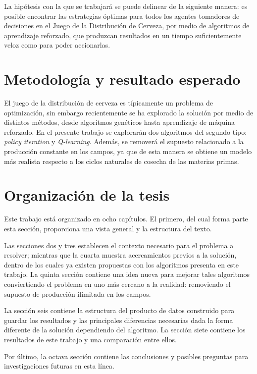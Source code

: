 La hip\'otesis con la que se trabajar\'a se puede delinear de la siguiente manera: es posible encontrar las estrategias \'optimas para todos los agentes tomadores de decisiones en el Juego de la Distribuci\'on de Cerveza, por medio de algoritmos de aprendizaje reforzado, que produzcan resultados en un tiempo suficientemente veloz como para poder accionarlas.\\

\section{Metodolog\'ia y resultado esperado}

El juego de la distribuci\'on de cerveza es t\'ipicamente un problema de optimizaci\'on, sin embargo recientemente se ha explorado la soluci\'on por medio de distintos m\'etodos, desde algoritmos gen\'eticos hasta aprendizaje de m\'aquina reforzado. En el presente trabajo se explorar\'an dos algoritmos del segundo tipo: \textit{policy iteration} y \textit{Q-learning}. Adem\'as, se remover\'a el supuesto relacionado a la producci\'on constante en los campos, ya que de esta manera se obtiene un modelo m\'as realista respecto a los ciclos naturales de cosecha de las materias primas.

\section{Organizaci\'on de la tesis}

Este trabajo est\'a organizado en ocho cap\'itulos. El primero, del cual forma parte esta secci\'on, proporciona una vista general y la estructura del texto.

Las secciones dos y tres establecen el contexto necesario para el problema a resolver; mientras que la cuarta muestra acercamientos previos a la soluci\'on, dentro de los cuales ya existen propuestas con los algoritmos presenta en este trabajo. La quinta secci\'on contiene una idea nueva para mejorar tales algoritmos conviertiendo el problema en uno m\'as cercano a la realidad: removiendo el supuesto de producci\'on ilimitada en los campos.

La secci\'on seis contiene la estructura del producto de datos construido para guardar los resultados y las principales diferencias necesarias dada la forma diferente de la soluci\'on dependiendo del algoritmo. La secci\'on siete contiene los resultados de este trabajo y una comparaci\'on entre ellos.

Por \'ultimo, la octava secci\'on contiene las conclusiones y posibles preguntas para investigaciones futuras en esta l\'inea.